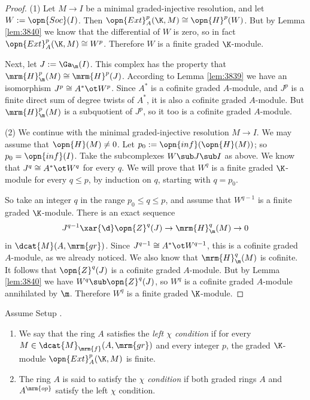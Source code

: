 \begin{proof} \mbox{}

\smallskip \noindent
(1) Let $M \to I$ be a minimal graded-injective resolution, and let 
$W := \opn{Soc}(I)$. Then $\opn{Ext}^p_A(\K, M) \cong \opn{H}^p(W)$. 
But by Lemma \ref{lem:3840} we know that the differential of $W$ is zero, so in 
fact $\opn{Ext}^p_A(\K, M) \cong W^p$. Therefore $W$ is a finite graded 
$\K$-module. 

Next, let $J := \Ga_{\m}(I)$. This complex has the property that 
$\mrm{H}^p_{\m}(M) \cong \mrm{H}^p(J)$. According to Lemma \ref{lem:3839} we 
have an isomorphism $J^p \cong A^* \ot W^p$. 
Since $A^*$ is a cofinite graded $A$-module, and $J^p$ is a finite direct sum 
of degree twists of $A^*$, it is also a cofinite graded $A$-module. But 
$\mrm{H}^p_{\m}(M)$ is a subquotient of $J^p$, so it too is a cofinite graded 
$A$-module. 

\medskip \noindent 
(2) We continue with the minimal graded-injective resolution $M \to I$. 
We may assume that $\opn{H}(M) \neq 0$. 
Let $p_0 := \opn{inf}(\opn{H}(M))$; so 
$p_0 = \opn{inf}(I)$. Take the subcomplexes $W \sub J \sub I$ as above. We know 
that $J^q \cong A^* \ot W^q$ for every $q$. We will prove that 
$W^q$ is a finite graded $\K$-module for every $q \leq p$, by induction on $q$, 
starting with $q = p_0$. 

So take an integer $q$ in the range $p_0 \leq q \leq p$, and assume that 
$W^{q - 1}$ is a finite graded $\K$-module. 
There is an exact sequence 
\[ J^{q - 1} \xar{\d} \opn{Z}^q(J) \to \mrm{H}^q_{\m}(M) \to  0  \]
in $\dcat{M}(A, \mrm{gr})$. 
Since $J^{q - 1} \cong A^* \ot W^{q - 1}$, this is a cofinite graded 
$A$-module, as we already noticed. We also know that $\mrm{H}^q_{\m}(M)$ is 
cofinite. It follows that $\opn{Z}^q(J)$ is a cofinite graded $A$-module.
But by Lemma \ref{lem:3840} we have 
$W^q \sub \opn{Z}^q(J)$, so $W^q$ is a cofinite graded $A$-module annihilated 
by $\m$. Therefore $W^q$ is a finite graded $\K$-module.
\end{proof}

\begin{dfn} \label{dfn:3713}
Assume Setup \tup{\ref{setup:3855}}.
\begin{enumerate}
\item We say that the ring $A$ satisfies the {\em left $\chi$ condition} 
if for every $M \in \dcat{M}_{\mrm{f}}(A, \mrm{gr})$
and every integer $p$, the graded $\K$-module 
$\opn{Ext}^p_{A}(\K, M)$ is finite. 

\item The ring $A$ is said to satisfy the 
{\em $\chi$ condition}%
if both graded rings $A$ and $A^{\mrm{op}}$ satisfy the left $\chi$ condition.
\end{enumerate}
\end{dfn}

